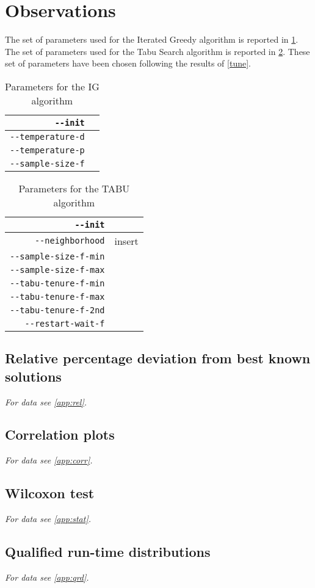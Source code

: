 \section{Observations}

The set of parameters used for the Iterated Greedy algorithm is reported in \ref{obs:table/ig-tune}. 
The set of parameters used for the Tabu Search algorithm is reported in \ref{obs:table/tabu-tune}. These set of parameters have been chosen following the results of \ref{tune}.


\begin{table}[H]
\begin{center}
\caption{Parameters for the IG algorithm}
\label{obs:table/ig-tune}
\begin{tabular}{|r|c|}
\hline
\verb!--init! & \\
\hline
\hline
\verb!--temperature-d! & \\
\hline
\verb!--temperature-p! & \\
\hline
\hline
\verb!--sample-size-f! & \\
\hline
\end{tabular}
\end{center}
\end{table}


\begin{table}[H]
\begin{center}
\caption{Parameters for the TABU algorithm}
\label{obs:table/tabu-tune}
\begin{tabular}{|r|c|}
\hline
\verb!--init! & \\
\hline
\verb!--neighborhood! & insert\\
\hline
\hline
\verb!--sample-size-f-min! & \\
\hline
\verb!--sample-size-f-max! & \\
\hline
\hline
\verb!--tabu-tenure-f-min! & \\
\hline
\verb!--tabu-tenure-f-max! & \\
\hline
\verb!--tabu-tenure-f-2nd! & \\
\hline
\hline
\verb!--restart-wait-f! & \\
\hline
\end{tabular}
\end{center}
\end{table}



\subsection{Relative percentage deviation from best known solutions}

\emph{For data see \ref{app:rel}.}

\subsection{Correlation plots}

\emph{For data see \ref{app:corr}.}

\subsection{Wilcoxon test}

\emph{For data see \ref{app:stat}.}

\subsection{Qualified run-time distributions}

\emph{For data see \ref{app:qrd}.}
